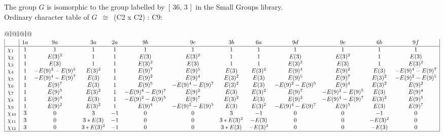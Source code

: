 \documentclass[varwidth=\maxdimen,border=10]{standalone}
\begin{document}
The group $G$ is isomorphic to the group labelled by\ [ 36, 3 ]\ in the Small Groups library.\\
Ordinary character table of $G$\ $\cong$\ (C2 x C2) : C9:\\
\begin{center}
\begin{tabular}{@{}l@{}l@{}l@{}}
\hline
\(\begin{array}{|l|cccccccccccc|}
  & 1a & 9a & 3a & 2a & 9b & 9c & 3b & 6a & 9d & 9e & 6b & 9f\\ \hline
\chi_{1} & 1 & 1 & 1 & 1 & 1 & 1 & 1 & 1 & 1 & 1 & 1 & 1\\
\chi_{2} & 1 & E(3)^{2} & 1 & 1 & E(3) & E(3)^{2} & 1 & 1 & E(3) & E(3)^{2} & 1 & E(3)\\
\chi_{3} & 1 & E(3) & 1 & 1 & E(3)^{2} & E(3) & 1 & 1 & E(3)^{2} & E(3) & 1 & E(3)^{2}\\
\chi_{4} & 1 & -E(9)^{2}-E(9)^{5} & E(3)^{2} & 1 & E(9)^{7} & E(9)^{5} & E(3) & E(3)^{2} & E(9)^{4} & E(9)^{2} & E(3) & -E(9)^{4}-E(9)^{7}\\
\chi_{5} & 1 & -E(9)^{4}-E(9)^{7} & E(3) & 1 & E(9)^{2} & E(9)^{4} & E(3)^{2} & E(3) & E(9)^{5} & E(9)^{7} & E(3)^{2} & -E(9)^{2}-E(9)^{5}\\
\chi_{6} & 1 & E(9)^{7} & E(3) & 1 & E(9)^{5} & -E(9)^{4}-E(9)^{7} & E(3)^{2} & E(3) & -E(9)^{2}-E(9)^{5} & E(9)^{4} & E(3)^{2} & E(9)^{2}\\
\chi_{7} & 1 & E(9)^{5} & E(3)^{2} & 1 & -E(9)^{4}-E(9)^{7} & E(9)^{2} & E(3) & E(3)^{2} & E(9)^{7} & -E(9)^{2}-E(9)^{5} & E(3) & E(9)^{4}\\
\chi_{8} & 1 & E(9)^{4} & E(3) & 1 & -E(9)^{2}-E(9)^{5} & E(9)^{7} & E(3)^{2} & E(3) & E(9)^{2} & -E(9)^{4}-E(9)^{7} & E(3)^{2} & E(9)^{5}\\
\chi_{9} & 1 & E(9)^{2} & E(3)^{2} & 1 & E(9)^{4} & -E(9)^{2}-E(9)^{5} & E(3) & E(3)^{2} & -E(9)^{4}-E(9)^{7} & E(9)^{5} & E(3) & E(9)^{7}\\
\chi_{10} & 3 & 0 & 3 & -1 & 0 & 0 & 3 & -1 & 0 & 0 & -1 & 0\\
\chi_{11} & 3 & 0 & 3*E(3) & -1 & 0 & 0 & 3*E(3)^{2} & -E(3) & 0 & 0 & -E(3)^{2} & 0\\
\chi_{12} & 3 & 0 & 3*E(3)^{2} & -1 & 0 & 0 & 3*E(3) & -E(3)^{2} & 0 & 0 & -E(3) & 0\\
\hline
\end{array}\)\\
\end{tabular}
\end{center}
\end{document}
